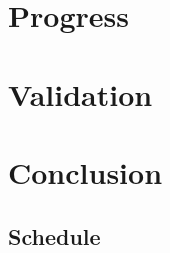 \documentclass{sig-alternate-05-2015}
\begin{document}
\section{Progress}
\label{sec:progress}
% 

\section{Validation}
\label{sec:validation}
% 

\section{Conclusion}
\label{sec:conclusion}

\subsection{Schedule}
\label{sec:schedule}
% 






\end{document}
